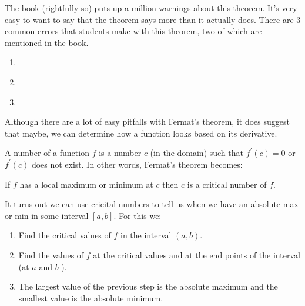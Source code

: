 \documentclass{ximera}
\begin{document}
\begin{warning}
The book (rightfully so) puts up a million warnings about this theorem. It's very easy to want to say that the theorem says more than it actually does. There are 3 common errors that students make with this theorem, two of which are mentioned in the book.
\end{warning}
\begin{enumerate}
\item \begin{freeResponse}\end{freeResponse}
\item \begin{freeResponse}\end{freeResponse}
\item \begin{freeResponse}\end{freeResponse}
\end{enumerate}

Although there are a lot of easy pitfalls with Fermat's theorem, it does suggest that maybe, we can determine how a function looks based on its derivative.

A  number of a function $f$ is a number $c$ (in the domain) such that $f^{\prime}(c)=0$ or $f^{\prime}(c)$ does not exist. In other words, Fermat's theorem becomes:

If $f$ has a local maximum or minimum at $c$ then $c$ is a critical number of $f$.

It turns out we can use cricital numbers to tell us when we have an absolute max or min in some interval $[a, b]$. For this we:
\begin{enumerate}
  \item Find the critical values of $f$ in the interval $(a, b)$.
  \item Find the values of $f$ at the critical values and at the end points of the interval (at $a$ and $b$ ).
  \item The largest value of the previous step is the absolute maximum and the smallest value is the absolute minimum.
\end{enumerate}
\end{document}
